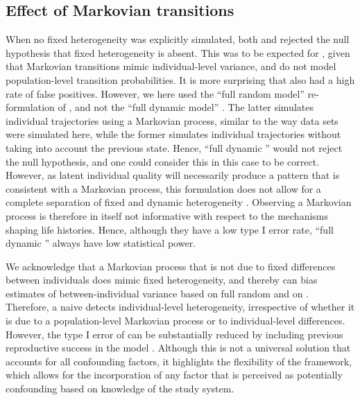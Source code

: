 \subsection{Effect of Markovian transitions}
When no fixed heterogeneity was explicitly simulated, both \MM and \NSM rejected the null hypothesis that fixed heterogeneity is absent. This was to be expected for \MM, given that Markovian transitions mimic individual-level variance, and \MM do not model population-level transition probabilities. It is more surprising that also \NSM had a high rate of false positives. However, we here used the ``full random model'' re-formulation of \NSM \parencite{Plard2012}, and not the ``full dynamic model'' \parencite{Tuljapurkar2009}. The latter simulates individual trajectories using a Markovian process, similar to the way data sets were simulated here, while the former simulates individual trajectories without taking into account the previous state.
Hence, ``full dynamic \NSM'' would not reject the null hypothesis, and one could consider this in this case to be correct. However, as latent individual quality will necessarily produce a pattern that is consistent with a Markovian process, this formulation does not allow for a complete separation of fixed and dynamic heterogeneity \parencite{Plard2012}.
Observing a Markovian process is therefore in itself not informative with respect to the mechanisms shaping life histories. Hence, although they have a low type I error rate, ``full dynamic \NSM'' always have low statistical power. 

We acknowledge that a Markovian process that is not due to fixed differences between individuals does mimic fixed heterogeneity, and thereby can bias estimates of between-individual variance based on full random \NSM and on \MM. Therefore, a naive \MM detects individual-level heterogeneity, irrespective of whether it is due to a population-level Markovian process or to individual-level differences. However, the type I error of \MM can be substantially reduced by including previous reproductive success in the model \parencite{Rotella2008, Cam2013}. Although this is not a universal solution that accounts for all confounding factors, it highlights the flexibility of the \MM framework, which allows for the incorporation of any factor that is perceived as potentially confounding based on knowledge of the study system. 

